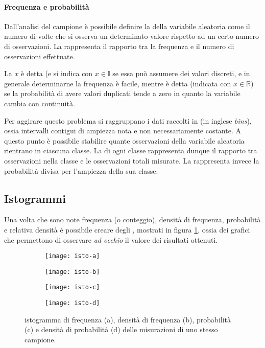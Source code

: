 	\paragraph{Frequenza e probabilità} Dall'analisi del campione è possibile definire la  della variabile aleatoria come il numero di volte che si osserva un determinato valore rispetto ad un certo numero di osservazioni. La  rappresenta  il rapporto tra la frequenza e il numero di osservazioni effettuate.
	
	La  $x$ è detta  (e si indica con $x\in \mathds I$ se essa può assumere dei valori discreti, e in generale determinarne la frequenza è facile, mentre è detta  (indicata con $x\in \mathds R$) se  la probabilità di avere valori duplicati tende a zero in quanto la variabile cambia con continuità.
		
	Per aggirare questo problema si raggruppano i dati raccolti in  (in inglese \textit{bins}), ossia intervalli contigui di ampiezza nota e non necessariamente costante. A questo punto è possibile stabilire quante osservazioni della variabile aleatoria rientrano in ciascuna classe. La  di ogni classe rappresenta dunque il rapporto tra osservazioni nella classe e le osservazioni totali misurate. La  rappresenta invece la probabilità divisa per l'ampiezza della sua classe.
	
	\subsection{Istogrammi} 
		Una volta che sono note frequenza (o conteggio), densità di frequenza, probabilità e relativa densità è possibile creare degli , mostrati in figura \ref{fig:stat:istogrammi}, ossia dei grafici che permettono di osservare \textit{ad occhio} il valore dei risultati ottenuti.
	
		\begin{figure}[bht]
			\centering
			\begin{subfigure}{0.45\linewidth}
				\centering
				\texttt{[image: isto-a]} \caption{}
			\end{subfigure}
			\begin{subfigure}{0.45\linewidth}
				\centering
				\texttt{[image: isto-b]} \caption{}
			\end{subfigure}
			\begin{subfigure}{0.45\linewidth}
				\centering
				\texttt{[image: isto-c]} \caption{}
			\end{subfigure}
			\begin{subfigure}{0.45\linewidth}
				\centering
				\texttt{[image: isto-d]} \caption{}
			\end{subfigure}
			\caption{istogramma di frequenza (a), densità di frequenza (b), probabilità (c) e densità di probabilità (d) delle misurazioni di uno stesso campione. } \label{fig:stat:istogrammi}
		\end{figure}
		
